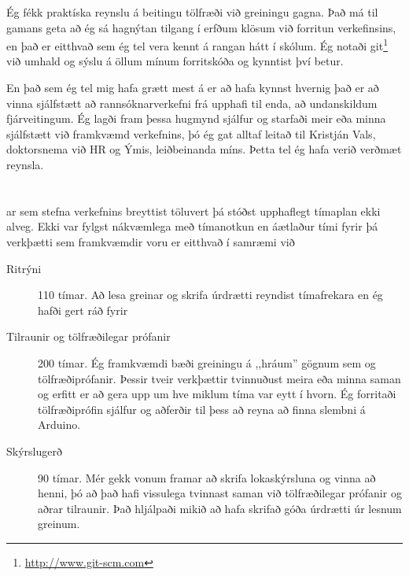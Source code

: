 \documentclass[a4paper]{article}           %
\newcommand{\tmpsection}[1]{}
\let\tmpsection=\section
\renewcommand{\section}[2]{

    \ifthenelse{
      \equal{#2}{Heimildir} %
    }
    {
      \tmpsection{\sc{#1} }
      \tmpsection{\sc{#2} }
    }
    {\tmpsection{\sc{#1} } }
      

}
\begin{document}
Ég fékk praktíska reynslu á beitingu tölfræði við greiningu gagna. Það má til gamans geta að ég sá hagnýtan tilgang í erfðum klösum við forritun verkefinsins, en það er eitthvað sem ég tel vera kennt á rangan hátt í skólum. Ég notaði git\footnote{\url{http://www.git-scm.com}} við umhald og sýslu á öllum mínum forritskóða og kynntist því betur. 

En það sem ég tel mig hafa grætt mest á er að hafa kynnst hvernig það er að vinna sjálfstætt að rannsóknarverkefni frá upphafi til enda, að undanskildum fjárveitingum. Ég lagði fram þessa hugmynd sjálfur og starfaði meir eða minna sjálfstætt við framkvæmd verkefnins, þó ég gat alltaf leitað til Kristján Vals, doktorsnema við HR og Ýmis, leiðbeinanda míns. Þetta tel ég hafa verið verðmæt reynsla. 

\section{Tími}

Þar sem stefna verkefnins breyttist töluvert þá stóðst upphaflegt tímaplan ekki alveg. Ekki var fylgst nákvæmlega með tímanotkun en áætlaður tími fyrir þá verkþætti sem framkvæmdir voru er eitthvað í samræmi við 

\begin{description}
\item[Ritrýni] 110 tímar. Að lesa greinar og skrifa úrdrætti reyndist tímafrekara en ég hafði gert ráð fyrir
\item[Tilraunir og tölfræðilegar prófanir] 200 tímar. Ég framkvæmdi bæði greiningu á ,,hráum'' gögnum sem og tölfræðiprófanir. Þessir tveir verkþættir tvinnuðust meira eða minna saman og erfitt er að gera upp um hve miklum tíma var eytt í hvorn. Ég forritaði tölfræðiprófin sjálfur og aðferðir til þess að reyna að finna slembni á Arduino. 
\item[Skýrslugerð] 90 tímar. Mér gekk vonum framar að skrifa lokaskýrsluna og vinna að henni, þó að það hafi vissulega tvinnast saman við tölfræðilegar prófanir og aðrar tilraunir. Það hljálpaði mikið að hafa skrifað góða úrdrætti úr lesnum greinum. 
\end{description}



\end{document}
